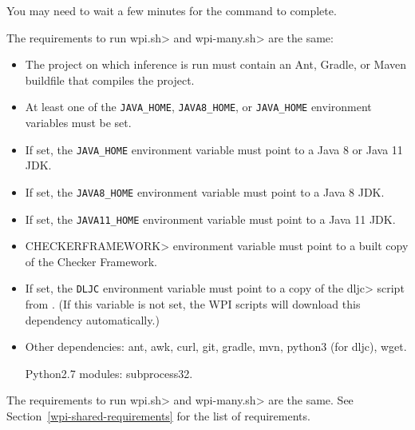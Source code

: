 You may need to wait a few minutes for the command to complete.



The requirements to run \<wpi.sh> and \<wpi-many.sh> are the same:

\begin{itemize}
\item The project on which inference is run must contain an Ant, Gradle,
  or Maven buildfile that compiles the project.
\item At least one of the \verb|JAVA_HOME|, \verb|JAVA8_HOME|, or \verb|JAVA_HOME| environment variables
must be set.
\item If set, the \verb|JAVA_HOME| environment variable must point to a Java 8 or Java 11 JDK.
\item If set, the \verb|JAVA8_HOME| environment variable must point to a Java 8 JDK.
\item If set, the \verb|JAVA11_HOME| environment variable must point to a Java 11 JDK.
\item \<CHECKERFRAMEWORK> environment variable must point to a built copy of the Checker Framework.
\item If set, the \verb|DLJC| environment variable must point to a copy of the \<dljc> script
from . (If this variable is not
set, the WPI scripts will download this dependency automatically.)
\item Other dependencies:
  ant,
  awk,
  curl,
  git,
  gradle,
  mvn,
  python3 (for dljc),
  wget.

  Python2.7 modules:
  subprocess32.
\end{itemize}




The requirements to run \<wpi.sh> and \<wpi-many.sh> are the same. See Section~\ref{wpi-shared-requirements}
for the list of requirements.

